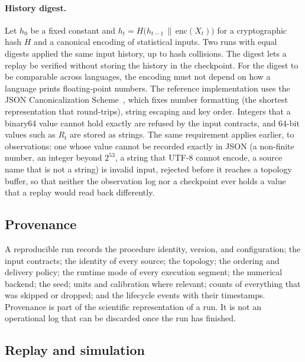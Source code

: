 \documentclass[11pt,a4paper]{article}
\theoremstyle{definition}
\theoremstyle{remark}
\begin{document}
\paragraph{History digest.}
Let $h_0$ be a fixed constant and
$h_t=H\bigl(h_{t-1}\,\|\,\mathrm{enc}(X_t)\bigr)$ for a cryptographic
hash $H$ and a canonical encoding of statistical inputs. Two runs with
equal digests applied the same input history, up to hash collisions. The digest lets a replay
be verified without storing the history in the checkpoint.
For the digest to be comparable across languages, the encoding must not
depend on how a language prints floating-point numbers. The reference
implementation uses the JSON Canonicalization Scheme~\cite{rfc8785},
which fixes number formatting (the shortest representation that
round-trips), string escaping and key order. Integers that a binary64
value cannot hold exactly are refused by the input contracts, and 64-bit
values such as $R_t$ are stored as strings. The same requirement applies
earlier, to observations: one whose value cannot be recorded exactly in
JSON (a non-finite number, an integer beyond $2^{53}$, a string that
UTF-8 cannot encode, a source name that is not a string) is invalid
input, rejected before it reaches a topology buffer, so that neither the observation log nor a checkpoint ever holds
a value that a replay would read back differently.

\subsection{Provenance}
\label{sec:provenance}

A reproducible run records the procedure identity, version, and
configuration; the input contracts; the identity of every source; the
topology; the ordering and delivery policy; the runtime mode of every
execution segment; the numerical backend; the seed; units and
calibration where relevant; counts of everything that was skipped or
dropped; and the lifecycle events with their timestamps. Provenance is
part of the scientific representation of a run. It is not an operational
log that can be discarded once the run has finished.

\subsection{Replay and simulation}
\label{sec:replay}
\end{document}

